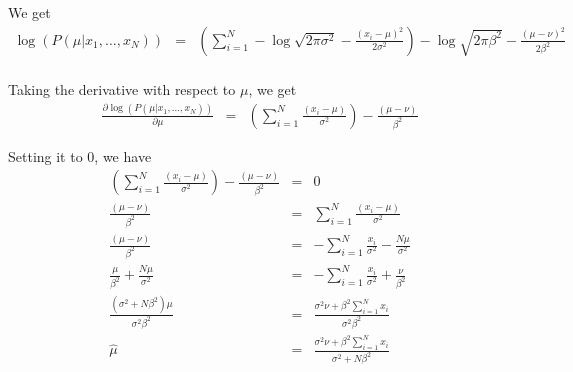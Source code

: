 \documentclass[12pt]{article}
\begin{document}
We get
\begin{eqnarray*}
  \log(P(\mu | x_1, \dots, x_N ))
  &=& \left( \sum_{i=1}^N -\log {\sqrt{2 \pi \sigma^2}}
    -\frac {(x_i - \mu)^2}{2 \sigma^2} \right) - \log {\sqrt{2 \pi \beta^2}}
    -\frac {(\mu - \nu)^2}{2 \beta^2} \\
\end{eqnarray*}

Taking the derivative with respect to $\mu$, we get
\begin{eqnarray*}
  \frac {\partial \log(P(\mu | x_1, \dots, x_N ))} {\partial \mu}
  &=& \left( \sum_{i=1}^N \frac {(x_i - \mu)}{\sigma^2} \right)
      -\frac {(\mu - \nu)}{\beta^2}
\end{eqnarray*}

Setting it to 0, we have
\begin{eqnarray*}
  \left( \sum_{i=1}^N \frac {(x_i - \mu)}{\sigma^2} \right)
  -\frac {(\mu - \nu)}{\beta^2} &=& 0 \\
  \frac {(\mu - \nu)}{\beta^2}
  &=& \sum_{i=1}^N \frac {(x_i - \mu)}{\sigma^2} \\
  \frac {(\mu - \nu)}{\beta^2}
  &=& - \sum_{i=1}^N \frac {x_i}{\sigma^2} - \frac {N \mu}{\sigma^2} \\
  \frac {\mu}{\beta^2} + \frac {N \mu}{\sigma^2}
  &=& - \sum_{i=1}^N \frac {x_i}{\sigma^2} + \frac {\nu}{\beta^2}\\
  \frac{(\sigma^2 + N \beta^2) \mu}{\sigma^2 \beta^2}
  &=& \frac{\sigma^2 \nu + \beta^2 \sum_{i=1}^N x_i}{\sigma^2 \beta^2} \\
  \hat {\mu} &=& \frac {\sigma^2 \nu + \beta^2 \sum_{i=1}^N x_i}
  {\sigma^2 + N \beta^2} \\
\end{eqnarray*}
\end{document}
